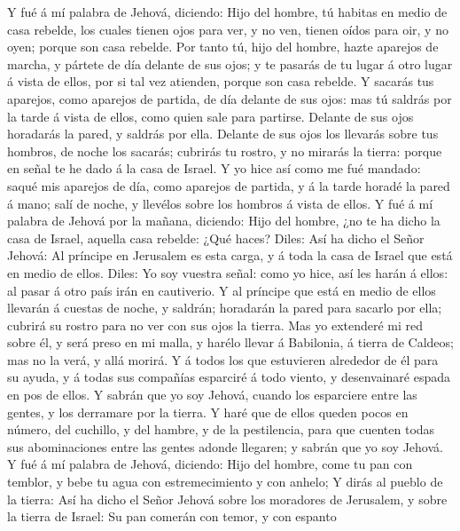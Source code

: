  Y fué á mí palabra de Jehová, diciendo:  Hijo
del hombre, tú habitas en medio de casa rebelde, los cuales tienen ojos
para ver, y no ven, tienen oídos para oir, y no oyen; porque son casa
rebelde.  Por tanto tú, hijo del hombre, hazte aparejos de
marcha, y pártete de día delante de sus ojos; y te pasarás de tu lugar á
otro lugar á vista de ellos, por si tal vez atienden, porque son casa
rebelde.  Y sacarás tus aparejos, como aparejos de partida,
de día delante de sus ojos: mas tú saldrás por la tarde á vista de
ellos, como quien sale para partirse.  Delante de sus ojos
horadarás la pared, y saldrás por ella.  Delante de sus ojos
los llevarás sobre tus hombros, de noche los sacarás; cubrirás tu
rostro, y no mirarás la tierra: porque en señal te he dado á la casa de
Israel.  Y yo hice así como me fué mandado: saqué mis
aparejos de día, como aparejos de partida, y á la tarde horadé la pared
á mano; salí de noche, y llevélos sobre los hombros á vista de ellos.
 Y fué á mí palabra de Jehová por la mañana, diciendo:
 Hijo del hombre, ¿no te ha dicho la casa de Israel, aquella
casa rebelde: ¿Qué haces?  Diles: Así ha dicho el Señor
Jehová: Al príncipe en Jerusalem es esta carga, y á toda la casa de
Israel que está en medio de ellos.  Diles: Yo soy vuestra
señal: como yo hice, así les harán á ellos: al pasar á otro país irán en
cautiverio.  Y al príncipe que está en medio de ellos
llevarán á cuestas de noche, y saldrán; horadarán la pared para sacarlo
por ella; cubrirá su rostro para no ver con sus ojos la tierra.
 Mas yo extenderé mi red sobre él, y será preso en mi
malla, y harélo llevar á Babilonia, á tierra de Caldeos; mas no la verá,
y allá morirá.  Y á todos los que estuvieren alrededor de
él para su ayuda, y á todas sus compañías esparciré á todo viento, y
desenvainaré espada en pos de ellos.  Y sabrán que yo soy
Jehová, cuando los esparciere entre las gentes, y los derramare por la
tierra.  Y haré que de ellos queden pocos en número, del
cuchillo, y del hambre, y de la pestilencia, para que cuenten todas sus
abominaciones entre las gentes adonde llegaren; y sabrán que yo soy
Jehová.  Y fué á mí palabra de Jehová, diciendo:
 Hijo del hombre, come tu pan con temblor, y bebe tu agua
con estremecimiento y con anhelo;  Y dirás al pueblo de la
tierra: Así ha dicho el Señor Jehová sobre los moradores de Jerusalem, y
sobre la tierra de Israel: Su pan comerán con temor, y con espanto
